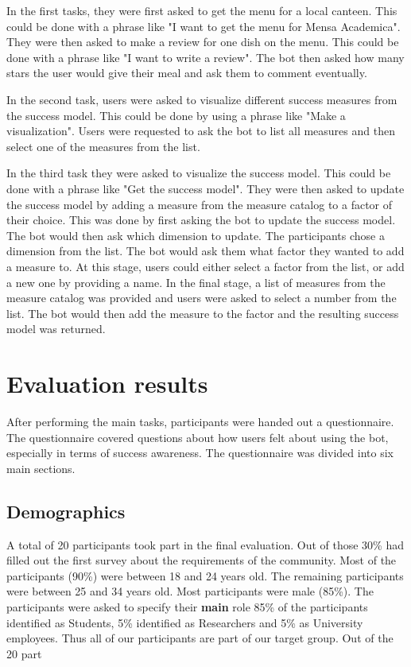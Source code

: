 In the first tasks, they were first asked to get the menu for a local canteen. This could be done with a phrase like "I want to get the menu for Mensa Academica".
They were then asked to make a review for one dish on the menu. This could be done with a phrase like "I want to write a review". The bot then asked how many stars the user would give their meal and ask them to  comment eventually.  

In the second task, users were asked to visualize different success measures from the success model. This could be done by using a phrase like "Make a visualization". Users were requested to ask the bot to list all measures and then select one of the measures from the list.

In the third task they were asked to visualize the success model. This could be done with a phrase like "Get the success model". They were then asked to update the success model by adding a measure from the measure catalog to a factor of their choice. 
This was done by first asking the bot to update the success model. The bot would then ask which dimension to update. 
The participants chose a dimension from the list. 
The bot would ask them what factor they wanted to add a measure to. 
At this stage, users could either select a factor from the list, or add a new one by providing a name. 
In the final stage, a list of measures from the measure catalog was provided and users were asked to select a number from the list. 
The bot would then add the measure to the factor and the resulting success model was returned.

\section{Evaluation results}

After performing the main tasks, participants were handed out a questionnaire.
The questionnaire covered questions about how users felt about using the bot, especially in terms of success awareness. The questionnaire was divided into six main sections. 

\subsection{Demographics}
A total of 20 participants took part in the final evaluation. Out of those 30\% had filled out the first survey about the requirements of the community. 
Most of the participants (90\%) were between 18 and 24 years old. The remaining participants were between 25 and 34 years old. Most participants were male (85\%).
The participants were asked to specify their \textbf{main} role 85\% of the participants identified as Students, 5\% identified as Researchers and 5\% as University employees. Thus all of our participants are part of our target group. Out of the 20 part 


